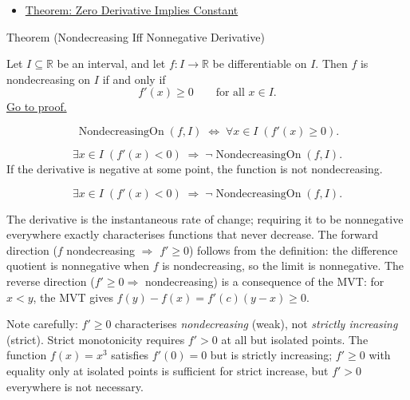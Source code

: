 \begin{remark*}[Dependencies]
\begin{itemize}
  \item \hyperref[thm:zero-derivative-implies-constant]{Theorem: Zero Derivative Implies Constant}
\end{itemize}
\end{remark*}


\begin{theorembox}{Theorem (Nondecreasing Iff Nonnegative Derivative)}
\begin{theorem}
\label{thm:nondecreasing-iff-nonneg-derivative}
Let $I \subseteq \mathbb{R}$ be an interval, and let $f : I \to \mathbb{R}$ be differentiable on $I$. Then $f$ is nondecreasing on $I$ if and only if
\[
f'(x) \geq 0 \qquad \text{for all } x \in I.
\]
\hyperref[prf:nondecreasing-iff-nonneg-derivative]{Go to proof.}
\end{theorem}
\end{theorembox}

\begin{remark*}
\[
\operatorname{NondecreasingOn}(f,I)
\;\iff\;
\forall x \in I\;(f'(x) \geq 0).
\]
\end{remark*}

\begin{remark*}
\[
\exists x \in I\;(f'(x) < 0)
\;\Rightarrow\;
\lnot\operatorname{NondecreasingOn}(f,I).
\]
If the derivative is negative at some point, the function is not nondecreasing.
\end{remark*}

\begin{remark*}
\[
\exists x \in I\;(f'(x) < 0) \;\Rightarrow\; \lnot\operatorname{NondecreasingOn}(f,I).
\]
\end{remark*}

\begin{remark*}[Interpretation]
The derivative is the instantaneous rate of change; requiring it to be nonnegative everywhere exactly characterises functions that never decrease. The forward direction ($f$ nondecreasing $\Rightarrow$ $f' \geq 0$) follows from the definition: the difference quotient is nonnegative when $f$ is nondecreasing, so the limit is nonnegative. The reverse direction ($f' \geq 0 \Rightarrow$ nondecreasing) is a consequence of the MVT: for $x < y$, the MVT gives $f(y)-f(x) = f'(c)(y-x) \geq 0$.

Note carefully: $f' \geq 0$ characterises \emph{nondecreasing} (weak), not \emph{strictly increasing} (strict). Strict monotonicity requires $f' > 0$ at all but isolated points. The function $f(x) = x^3$ satisfies $f'(0) = 0$ but is strictly increasing; $f' \geq 0$ with equality only at isolated points is sufficient for strict increase, but $f' > 0$ everywhere is not necessary.
\end{remark*}

